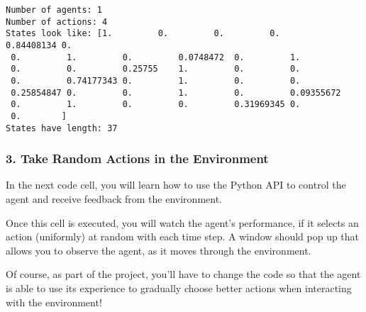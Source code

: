 \documentclass[11pt]{article}
\begin{document}
    \begin{Verbatim}[commandchars=\\\{\}]
Number of agents: 1
Number of actions: 4
States look like: [1.         0.         0.         0.         0.84408134 0.
 0.         1.         0.         0.0748472  0.         1.
 0.         0.         0.25755    1.         0.         0.
 0.         0.74177343 0.         1.         0.         0.
 0.25854847 0.         0.         1.         0.         0.09355672
 0.         1.         0.         0.         0.31969345 0.
 0.        ]
States have length: 37

    \end{Verbatim}

    \subsubsection{3. Take Random Actions in the
Environment}\label{take-random-actions-in-the-environment}

In the next code cell, you will learn how to use the Python API to
control the agent and receive feedback from the environment.

Once this cell is executed, you will watch the agent's performance, if
it selects an action (uniformly) at random with each time step. A window
should pop up that allows you to observe the agent, as it moves through
the environment.

Of course, as part of the project, you'll have to change the code so
that the agent is able to use its experience to gradually choose better
actions when interacting with the environment!
\end{document}
